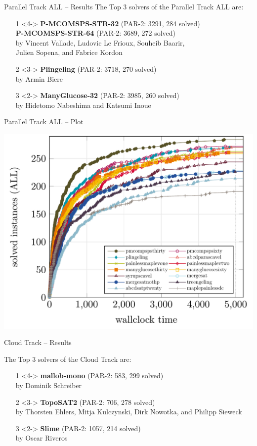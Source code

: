 \documentclass{beamer}
\begin{document}
\begin{frame}{Parallel Track ALL -- Results}
The Top 3 solvers of the Parallel Track ALL are:
\begin{itemize}
\item[1]<4-> {\bf P-MCOMSPS-STR-32} (PAR-2: 3291, 284 solved)\\
{\bf P-MCOMSPS-STR-64} (PAR-2: 3689, 272 solved)\\
by Vincent Vallade, Ludovic Le Frioux, Souheib Baarir,\\Julien Sopena, and Fabrice Kordon
\item[2]<3-> {\bf Plingeling} (PAR-2: 3718, 270 solved)\\
by Armin Biere
\item[3]<2-> {\bf ManyGlucose-32} (PAR-2: 3985, 260 solved)\\
by Hidetomo Nabeshima and Katsumi Inoue
\end{itemize}
\end{frame}

\begin{frame}{Parallel Track ALL -- Plot}

\centering
\includegraphics[width=.8\textwidth]{parallel-ALL}

\end{frame}



\begin{frame}{Cloud Track -- Results}

The Top 3 solvers of the Cloud Track are:
\begin{itemize}

\item[1]<4-> {\bf mallob-mono} (PAR-2: 583, 299 solved)\\
by Dominik Schreiber
\item[2]<3-> {\bf TopoSAT2} (PAR-2: 706, 278 solved)\\
by Thorsten Ehlers, Mitja Kulczynski, Dirk Nowotka, and Philipp Sieweck
\item[3]<2-> {\bf Slime} (PAR-2: 1057, 214 solved)\\
by Oscar Riveros
\end{itemize}


\end{frame}
\end{document}
